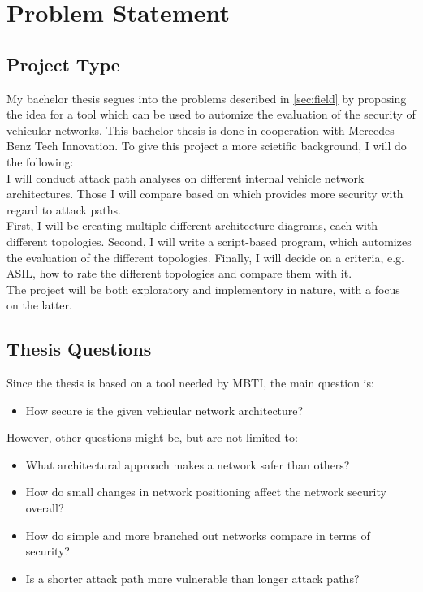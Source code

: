 
\chapter{Problem Statement}
\label{sec:problem}

\section{Project Type}\label{sec:type}

My bachelor thesis segues into the problems described in \ref{sec:field} by proposing the idea for a tool which can be used to automize the evaluation of the security of vehicular networks.
This bachelor thesis is done in cooperation with Mercedes-Benz Tech Innovation.
To give this project a more scietific background, I will do the following: \\

I will conduct attack path analyses on different internal vehicle network architectures.
Those I will compare based on which provides more security with regard to attack paths.\\

First, I will be creating multiple different architecture diagrams, each with different topologies.
Second, I will write a script-based program, which automizes the evaluation of the different topologies.
Finally, I will decide on a criteria, e.g. ASIL, how to rate the different topologies and compare them with it.\\

The project will be both exploratory and implementory in nature, with a focus on the latter.


\section{Thesis Questions}\label{sec:questions}

Since the thesis is based on a tool needed by MBTI, the main question is:\\

\begin{itemize}
    \item How secure is the given vehicular network architecture?
\end{itemize}

However, other questions might be, but are not limited to:\\

\begin{itemize}
    \item What architectural approach makes a network safer than others?
    \item How do small changes in network positioning affect the network security overall?
    \item How do simple and more branched out networks compare in terms of security?
    \item Is a shorter attack path more vulnerable than longer attack paths?
\end{itemize}



